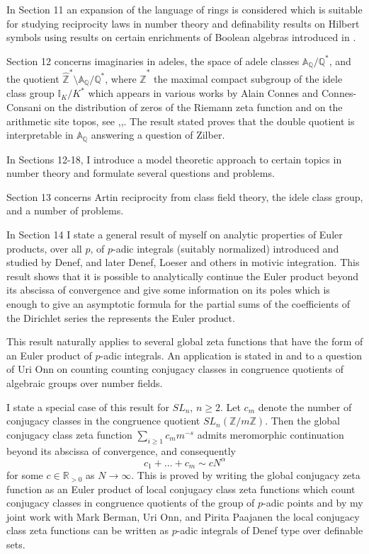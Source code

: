 \documentclass[12pt]{amsart}
\def\A{\mathbb{A}}
\def\I{\mathbb{I}}
\def\R{\mathbb{R}}
\def\Z{\mathbb{Z}}
\def\R{\mathbb{R}}
\def\Q{\mathbb{Q}}
\numberwithin{equation}{section}
\begin{document}
In Section 11 an expansion of the language of rings is considered which is suitable for studying 
reciprocity laws in number theory and definability results on Hilbert symbols using results on certain enrichments of Boolean algebras introduced in \cite{DM-bool}.

Section 12 concerns imaginaries in adeles, the space of adele classes $\A_{\Q}/\Q^*$, and the quotient $\hat{\Z}^*\setminus\A_{\Q}/\Q^*$, where $\hat{\Z}^*$ the maximal compact subgroup of the idele class group $\I_K/K^*$ which 
appears in various works by Alain Connes and Connes-Consani on the distribution of zeros of the Riemann zeta function and on the arithmetic site topos, see \cite{connes-selecta},\cite{CC2},\cite{connes-c-site}. 
The result stated proves that the double quotient is interpretable in $\A_{\Q}$ answering a question of Zilber.

In Sections 12-18, I introduce a model theoretic approach to certain topics in number theory and formulate several questions and problems.

Section 13 concerns Artin reciprocity from class field theory, the idele class group, and a number of problems.

In Section 14 I state a general result of myself \cite{zeta1} on analytic properties of Euler products, over all $p$, of $p$-adic integrals (suitably normalized) introduced and studied by Denef, and later Denef, Loeser and others in motivic integration. This result shows that it is possible to analytically continue the Euler product beyond its abscissa of convergence and give some information on its poles which is enough to give an asymptotic formula for the partial sums of the coefficients of the Dirichlet series the represents the Euler product. 

This result naturally applies to several global zeta functions that have the form of an Euler product of $p$-adic integrals. An application is stated in \cite{zeta1} and \cite{zeta-surv} to a question of Uri Onn on counting 
counting conjugacy classes in congruence quotients of algebraic groups over number fields. 

I state a special case of this result for $SL_n$, $n\geq 2$. Let $c_m$ denote the number of conjugacy classes in the congruence quotient $SL_n(\Z/m\Z)$. 
Then the global conjugacy class zeta function $\sum_{i\geq 1} c_m m^{-s}$ admits meromorphic continuation beyond its abscissa of convergence, and consequently 
$$c_1+\dots+c_m \sim cN^{\alpha}$$ for some $c\in \R_{>0}$ as $N\rightarrow \infty$. This is proved by writing the global conjugacy zeta function as an Euler product of local conjugacy class zeta functions which count conjugacy classes in congruence quotients of the group of $p$-adic points and by my joint 
work with Mark Berman, Uri Onn, and Pirita Paajanen \cite{BDOP} the local conjugacy class zeta functions can be written as
$p$-adic integrals of Denef type over definable sets.
\end{document}
